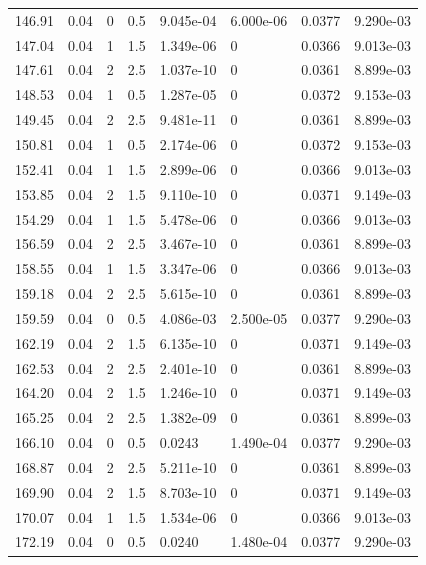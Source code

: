 \documentclass[preview]{standalone}
\begin{document}
{{{\begin{tabular}{L{1.2cm}C{1.2cm} C{0.3cm}C{0.5cm} C{1.4cm}C{1.4cm} C{1.4cm}C{1.4cm}}
  146.91  &  0.04  & 0     & 0.5 &  9.045e-04  & 6.000e-06  & 0.0377 &  9.290e-03   \\ 
  147.04  &  0.04  & 1     & 1.5 &  1.349e-06  & 0  & 0.0366 &  9.013e-03   \\ 
  147.61  &  0.04  & 2     & 2.5 &  1.037e-10  & 0  & 0.0361 &  8.899e-03   \\ 
  148.53  &  0.04  & 1     & 0.5 &  1.287e-05  & 0  & 0.0372 &  9.153e-03   \\ 
  149.45  &  0.04  & 2     & 2.5 &  9.481e-11  & 0  & 0.0361 &  8.899e-03   \\ 
  150.81  &  0.04  & 1     & 0.5 &  2.174e-06  & 0  & 0.0372 &  9.153e-03   \\ 
  152.41  &  0.04  & 1     & 1.5 &  2.899e-06  & 0  & 0.0366 &  9.013e-03   \\ 
  153.85  &  0.04  & 2     & 1.5 &  9.110e-10  & 0  & 0.0371 &  9.149e-03   \\ 
  154.29  &  0.04  & 1     & 1.5 &  5.478e-06  & 0  & 0.0366 &  9.013e-03   \\ 
  156.59  &  0.04  & 2     & 2.5 &  3.467e-10  & 0  & 0.0361 &  8.899e-03   \\ 
  158.55  &  0.04  & 1     & 1.5 &  3.347e-06  & 0  & 0.0366 &  9.013e-03   \\ 
  159.18  &  0.04  & 2     & 2.5 &  5.615e-10  & 0  & 0.0361 &  8.899e-03   \\ 
  159.59  &  0.04  & 0     & 0.5 &  4.086e-03  & 2.500e-05  & 0.0377 &  9.290e-03   \\ 
  162.19  &  0.04  & 2     & 1.5 &  6.135e-10  & 0  & 0.0371 &  9.149e-03   \\ 
  162.53  &  0.04  & 2     & 2.5 &  2.401e-10  & 0  & 0.0361 &  8.899e-03   \\ 
  164.20  &  0.04  & 2     & 1.5 &  1.246e-10  & 0  & 0.0371 &  9.149e-03   \\ 
  165.25  &  0.04  & 2     & 2.5 &  1.382e-09  & 0  & 0.0361 &  8.899e-03   \\ 
  166.10  &  0.04  & 0     & 0.5 &  0.0243  & 1.490e-04  & 0.0377 &  9.290e-03   \\ 
  168.87  &  0.04  & 2     & 2.5 &  5.211e-10  & 0  & 0.0361 &  8.899e-03   \\ 
  169.90  &  0.04  & 2     & 1.5 &  8.703e-10  & 0  & 0.0371 &  9.149e-03   \\ 
  170.07  &  0.04  & 1     & 1.5 &  1.534e-06  & 0  & 0.0366 &  9.013e-03   \\ 
  172.19  &  0.04  & 0     & 0.5 &  0.0240  & 1.480e-04  & 0.0377 &  9.290e-03   \\ 

\end{tabular}}}}
\end{document}
